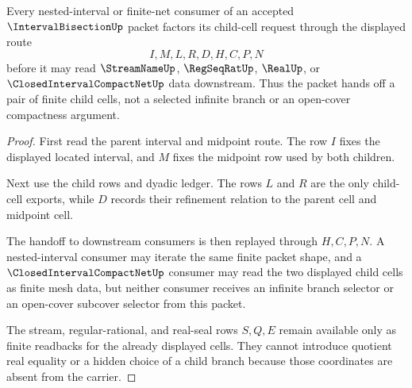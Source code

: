 \begin{theorem}
\label{thm:interval-bisection-nested-cell-handoff}
Every nested-interval or finite-net consumer of an accepted $\IntervalBisectionUp$ packet factors its child-cell request through the displayed route
$$
I,M,L,R,D,H,C,P,N
$$
before it may read $\StreamNameUp$, $\RegSeqRatUp$, $\RealUp$, or $\ClosedIntervalCompactNetUp$ data downstream. Thus the packet hands off a pair of finite child cells, not a selected infinite branch or an open-cover compactness argument.
\end{theorem}
\begin{proof}
First read the parent interval and midpoint route. The row $I$ fixes the displayed located interval, and $M$ fixes the midpoint row used by both children.

Next use the child rows and dyadic ledger. The rows $L$ and $R$ are the only child-cell exports, while $D$ records their refinement relation to the parent cell and midpoint cell.

The handoff to downstream consumers is then replayed through $H,C,P,N$. A nested-interval consumer may iterate the same finite packet shape, and a $\ClosedIntervalCompactNetUp$ consumer may read the two displayed child cells as finite mesh data, but neither consumer receives an infinite branch selector or an open-cover subcover selector from this packet.

The stream, regular-rational, and real-seal rows $S,Q,E$ remain available only as finite readbacks for the already displayed cells. They cannot introduce quotient real equality or a hidden choice of a child branch because those coordinates are absent from the carrier.
\end{proof}

